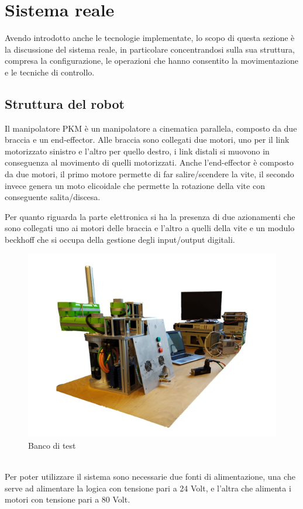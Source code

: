 \section{Sistema reale}
Avendo introdotto anche le tecnologie implementate, lo scopo di questa sezione è la discussione del sistema reale, in particolare concentrandosi sulla sua struttura, compresa la configurazione, le operazioni che hanno consentito la movimentazione e le tecniche di controllo.
\subsection{Struttura del robot}
Il manipolatore PKM è un manipolatore a cinematica parallela, composto da due braccia e un end-effector. Alle braccia sono collegati due motori, uno per il link motorizzato sinistro e l'altro per quello destro, i link distali si muovono in conseguenza al movimento di quelli motorizzati. Anche l'end-effector è composto da due motori, il primo motore permette di far salire/scendere la vite, il secondo invece genera un moto elicoidale che permette la rotazione della vite con conseguente salita/discesa. 
\par Per quanto riguarda la parte elettronica si ha la presenza di due azionamenti che sono collegati uno ai motori delle braccia e l'altro a quelli della vite e un modulo beckhoff che si occupa della gestione degli input/output digitali.
\begin{figure}[ht]
	\begin{center}
		\includegraphics[scale=0.6]{Immagini/Sperimentale/banco}
		\caption{Banco di test}
		\label{fig:BancoProva}
	\end{center}
\end{figure}
\\Per poter utilizzare il sistema sono necessarie due fonti di alimentazione, una che serve ad alimentare la logica con tensione pari a 24 Volt, e l'altra che alimenta i motori con tensione pari a  80 Volt.
